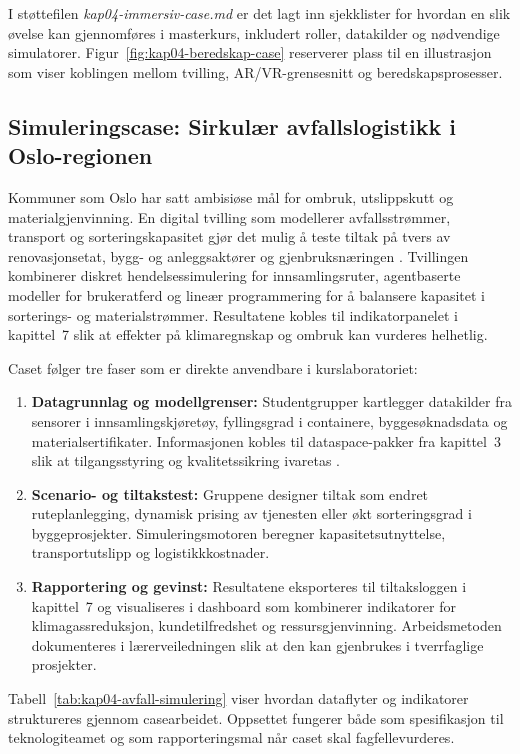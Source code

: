 I støttefilen \textit{kap04-immersiv-case.md} er det lagt inn sjekklister for hvordan en slik øvelse kan gjennomføres i masterkurs, inkludert roller, datakilder og nødvendige simulatorer. Figur~\ref{fig:kap04-beredskap-case} reserverer plass til en illustrasjon som viser koblingen mellom tvilling, AR/VR-grensesnitt og beredskapsprosesser.

\subsection{Simuleringscase: Sirkulær avfallslogistikk i Oslo-regionen}
Kommuner som Oslo har satt ambisiøse mål for ombruk, utslippskutt og materialgjenvinning. En digital tvilling som modellerer avfallsstrømmer, transport og sorteringskapasitet gjør det mulig å teste tiltak på tvers av renovasjonsetat, bygg- og anleggsaktører og gjenbruksnæringen \citep{oslo2023sirkularstrategi,ren2024ressursdataplattform}. Tvillingen kombinerer diskret hendelsessimulering for innsamlingsruter, agentbaserte modeller for brukeratferd og lineær programmering for å balansere kapasitet i sorterings- og materialstrømmer. Resultatene kobles til indikatorpanelet i kapittel~7 slik at effekter på klimaregnskap og ombruk kan vurderes helhetlig.

Caset følger tre faser som er direkte anvendbare i kurslaboratoriet:
\begin{enumerate}
    \item \textbf{Datagrunnlag og modellgrenser:} Studentgrupper kartlegger datakilder fra sensorer i innsamlingskjøretøy, fyllingsgrad i containere, byggesøknadsdata og materialsertifikater. Informasjonen kobles til dataspace-pakker fra kapittel~3 slik at tilgangsstyring og kvalitetssikring ivaretas \citep{norsus2022materialflyt}.
    \item \textbf{Scenario- og tiltakstest:} Gruppene designer tiltak som endret ruteplanlegging, dynamisk prising av tjenesten eller økt sorteringsgrad i byggeprosjekter. Simuleringsmotoren beregner kapasitetsutnyttelse, transportutslipp og logistikkkostnader.
    \item \textbf{Rapportering og gevinst:} Resultatene eksporteres til tiltaksloggen i kapittel~7 og visualiseres i dashboard som kombinerer indikatorer for klimagassreduksjon, kundetilfredshet og ressursgjenvinning. Arbeidsmetoden dokumenteres i lærerveiledningen slik at den kan gjenbrukes i tverrfaglige prosjekter.
\end{enumerate}

Tabell~\ref{tab:kap04-avfall-simulering} viser hvordan dataflyter og indikatorer struktureres gjennom casearbeidet. Oppsettet fungerer både som spesifikasjon til teknologiteamet og som rapporteringsmal når caset skal fagfellevurderes.

